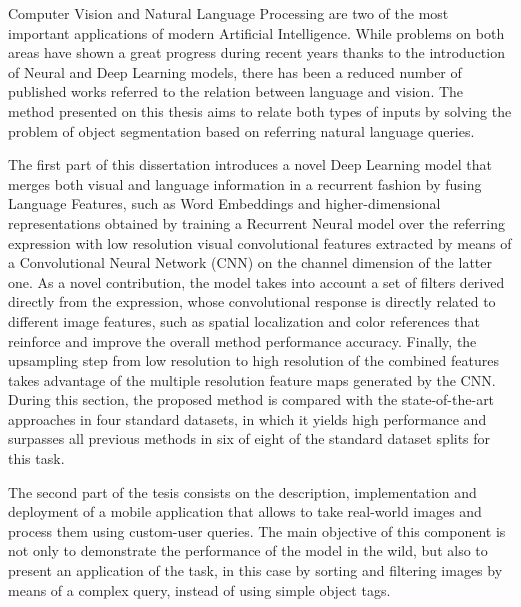 
Computer Vision and Natural Language Processing are two of the most important applications of modern Artificial Intelligence. While problems on both areas have shown a great progress during recent years thanks to the introduction of Neural and Deep Learning models, there has been a reduced number of published works referred to the relation between language and vision. The method presented on this thesis aims to relate both types of inputs by solving the problem of object segmentation based on referring natural language queries.

The first part of this dissertation introduces a novel Deep Learning model that merges both visual and language information in a recurrent fashion by fusing Language Features, such as Word Embeddings and higher-dimensional representations obtained by training a Recurrent Neural model over the referring expression with low resolution visual convolutional features extracted by means of a Convolutional Neural Network (CNN) on the channel dimension of the latter one. As a novel contribution, the model takes into account a set of filters derived directly from the expression, whose convolutional response is directly related to different image features, such as spatial localization and color references that reinforce and improve the overall method performance accuracy. Finally, the upsampling step from low resolution to high resolution of the combined features takes advantage of the multiple resolution feature maps generated by the CNN. During this section, the proposed method is compared with the state-of-the-art approaches in four standard datasets, in which it yields high performance and surpasses all previous methods in six of eight of the standard dataset splits for this task.    

The second part of the tesis consists on the description, implementation and deployment of a mobile application that allows to take real-world images and process them using custom-user queries. The main objective of this component is not only to demonstrate the performance of the model in the wild, but also to present an application of the task, in this case by sorting and filtering images by means of a complex query, instead of using simple object tags.  

